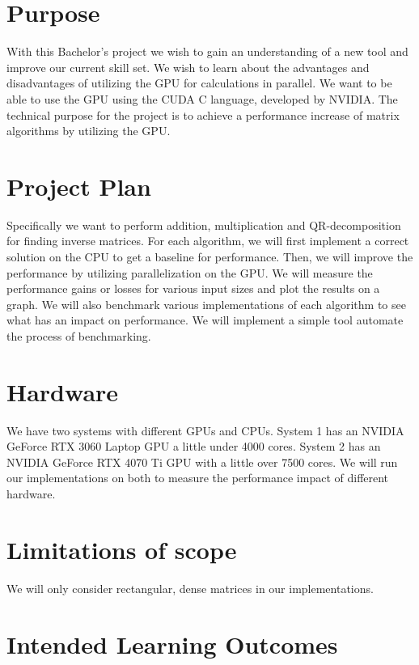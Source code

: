 \section*{Purpose}

With this Bachelor's project we wish to gain an understanding of a new tool and improve our current skill set. We wish to learn about the advantages and disadvantages of utilizing the GPU for calculations in parallel. We want to be able to use the GPU using the CUDA C language, developed by NVIDIA. The technical purpose for the project is to achieve a performance increase of matrix algorithms by utilizing the GPU.

\section*{Project Plan}

Specifically we want to perform addition, multiplication and QR-decomposition for finding inverse matrices. For each algorithm, we will first implement a correct solution on the CPU to get a baseline for performance. Then, we will improve the performance by utilizing parallelization on the GPU. We will measure the performance gains or losses for various input sizes and plot the results on a graph. We will also benchmark various implementations of each algorithm to see what has an impact on performance. 
We will implement a simple tool automate the process of benchmarking. 

\section*{Hardware}

We have two systems with different GPUs and CPUs. System 1 has an NVIDIA GeForce RTX 3060 Laptop GPU a little under 4000 cores. System 2 has an NVIDIA GeForce RTX 4070 Ti GPU with a little over 7500 cores. We will run our implementations on both to measure the performance impact of different hardware. 

\section*{Limitations of scope}

We will only consider rectangular, dense matrices in our implementations. 

\section*{Intended Learning Outcomes}

